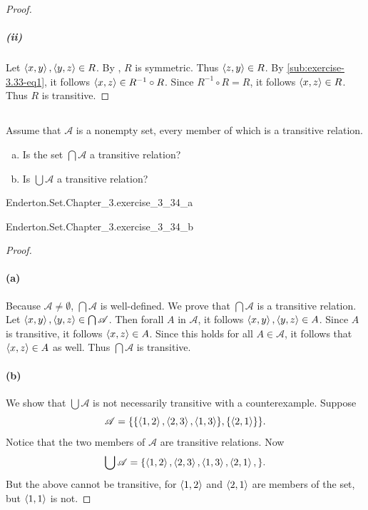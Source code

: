 \documentclass{report}
\begin{document}
\begin{proof}
      \subparagraph{(ii)}%

        Let $\left< x, y \right>, \left< y, z \right> \in R$.
        By , $R$ is symmetric.
        Thus $\left< z, y \right> \in R$.
        By \eqref{sub:exercise-3.33-eq1}, it follows
          $\left< x, z \right> \in R^{-1} \circ R$.
        Since $R^{-1} \circ R = R$, it follows $\left< x, z \right> \in R$.
        Thus $R$ is transitive.

  \end{proof}

\subsection{}%

  Assume that $\mathscr{A}$ is a nonempty set, every member of which is a
    transitive relation.
  \begin{enumerate}[(a)]
    \item Is the set $\bigcap{\mathscr{A}}$ a transitive relation?
    \item Is $\bigcup{\mathscr{A}}$ a transitive relation?
  \end{enumerate}

    {Enderton.Set.Chapter\_3.exercise\_3\_34\_a}

    {Enderton.Set.Chapter\_3.exercise\_3\_34\_b}

  \begin{proof}

    \paragraph{(a)}%

      Because $\mathscr{A} \neq \emptyset$, $\bigcap{\mathscr{A}}$ is
        well-defined.
      We prove that $\bigcap{\mathscr{A}}$ is a transitive relation.
      Let $\left< x, y \right>, \left< y, z \right> \in \bigcap{\mathscr{A}}$.
      Then forall $A$ in $\mathscr{A}$, it follows
        $\left< x, y \right>, \left< y, z \right> \in A$.
      Since $A$ is transitive, it follows $\left< x, z \right> \in A$.
      Since this holds for all $A \in \mathscr{A}$, it follows that
        $\left< x, z \right> \in A$ as well.
      Thus $\bigcap{\mathscr{A}}$ is transitive.

    \paragraph{(b)}%

      We show that $\bigcup{\mathscr{A}}$ is not necessarily transitive with a
        counterexample.
      Suppose $$\mathscr{A} = \{
        \{\left< 1, 2 \right>, \left< 2, 3 \right>, \left< 1, 3 \right>\}, \{\left< 2, 1 \right>\}
      \}.$$
      Notice that the two members of $\mathscr{A}$ are transitive relations.
      Now $$\bigcup{\mathscr{A}} = \{
        \left< 1, 2 \right>, \left< 2, 3 \right>, \left< 1, 3 \right>, \left< 2, 1 \right>,
      \}.$$
      But the above cannot be transitive, for $\left< 1, 2 \right>$ and $\left< 2, 1 \right>$
        are members of the set, but $\left< 1, 1 \right>$ is not.

  \end{proof}
\end{document}
